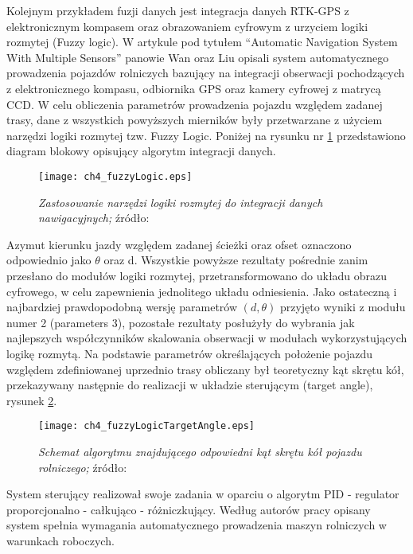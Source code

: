 \indent Kolejnym przykładem fuzji danych jest integracja danych RTK-GPS z elektronicznym kompasem oraz obrazowaniem cyfrowym z urzyciem logiki rozmytej (Fuzzy logic).
W artykule pod tytułem “Automatic Navigation System With Multiple Sensors” panowie Wan oraz Liu
opisali system automatycznego prowadzenia pojazdów rolniczych bazujący na integracji obserwacji pochodzących z elektronicznego kompasu,
odbiornika GPS oraz kamery cyfrowej z matrycą CCD. W celu obliczenia parametrów prowadzenia pojazdu względem zadanej trasy,
dane z wszystkich powyższych mierników były przetwarzane z użyciem narzędzi logiki rozmytej tzw. Fuzzy Logic.
Poniżej na rysunku nr \ref{fig:ch4_fuzzyLogic} przedstawiono diagram blokowy opisujący algorytm integracji danych.
\begin{figure}[H]
\centering
\texttt{[image: ch4\_fuzzyLogic.eps]}
\caption{\textit{Zastosowanie narzędzi logiki rozmytej do integracji danych nawigacyjnych;}\newline
źródło: \cite[][strona 774]{CCTA_769_775}}
\label{fig:ch4_fuzzyLogic}
\end{figure}

Azymut kierunku jazdy względem zadanej ścieżki oraz ofset oznaczono odpowiednio jako $\theta$ oraz d.
Wszystkie powyższe rezultaty pośrednie zanim przesłano do modułów logiki rozmytej, przetransformowano do układu obrazu cyfrowego,
w celu zapewnienia jednolitego układu odniesienia. Jako ostateczną i najbardziej prawdopodobną wersję parametrów $(d, \theta )$
przyjęto wyniki z modułu numer 2 (parameters 3), pozostałe rezultaty posłużyły do wybrania jak najlepszych współczynników skalowania obserwacji
w modułach wykorzystujących logikę rozmytą. Na podstawie parametrów określających położenie pojazdu względem zdefiniowanej uprzednio trasy
obliczany był teoretyczny kąt skrętu kół, przekazywany następnie do realizacji w układzie sterującym (target angle), rysunek \ref{fig:ch4_fuzzyLogicTargetAngle}.
\begin{figure}[H]
\centering
\texttt{[image: ch4\_fuzzyLogicTargetAngle.eps]}
\caption{\textit{Schemat algorytmu znajdującego odpowiedni kąt skrętu kół pojazdu rolniczego;}\newline
	źródło: \cite[][strona 775]{CCTA_769_775}}
\label{fig:ch4_fuzzyLogicTargetAngle}
\end{figure}
System sterujący realizował swoje zadania w oparciu o algorytm PID - regulator proporcjonalno - całkująco - różniczkujący.
Według autorów pracy \cite{CCTA_769_775} opisany system spełnia wymagania automatycznego prowadzenia maszyn rolniczych w warunkach roboczych.
